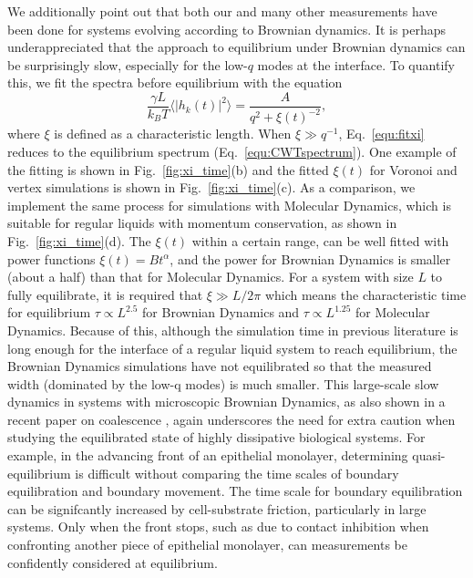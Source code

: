 \documentclass[twoside,twocolumn,9pt]{article}
\begin{document}
We additionally point out that both our and many other measurements have been done for systems evolving according to Brownian dynamics. It is perhaps underappreciated that the approach to equilibrium under Brownian dynamics can be surprisingly slow, especially for the low-$q$ modes at the interface. To quantify this, we fit the spectra before equilibrium with the equation 
\begin{equation}
    \frac{\gamma L}{k_B T}\langle |h_k(t)|^2\rangle = \frac{A}{q^2+\xi(t)^{-2}}, 
    \label{equ:fitxi}
\end{equation}
where $\xi$ is defined as a characteristic length. When $\xi \gg q^{-1}$, Eq.~\ref{equ:fitxi} reduces to the equilibrium spectrum (Eq.~\ref{equ:CWTspectrum}). One example of the fitting is shown in Fig.~\ref{fig:xi_time}(b) and the fitted $\xi(t)$ for Voronoi and vertex simulations is shown in Fig.~\ref{fig:xi_time}(c). As a comparison, we implement the same process for simulations with Molecular Dynamics, which is suitable for regular liquids with momentum conservation, as shown in Fig.~\ref{fig:xi_time}(d). The $\xi(t)$ within a certain range, can be well fitted with power functions $\xi(t)=Bt^\alpha$, and the power for Brownian Dynamics is smaller (about a half) than that for Molecular Dynamics. For a system with size $L$ to fully equilibrate, it is required that $\xi \gg L/2\pi$ which means the characteristic time for equilibrium $\tau \propto L^{2.5}$ for Brownian Dynamics and $\tau \propto L^{1.25}$ for Molecular Dynamics. Because of this, although the simulation time in previous literature \cite{sussman2018soft} is long enough for the interface of a regular liquid system to reach equilibrium, the Brownian Dynamics simulations have not equilibrated so that the measured width (dominated by the low-q modes) is much smaller. This large-scale slow dynamics in systems with microscopic Brownian Dynamics, as also shown in a recent paper on coalescence \cite{yue2024coalescing}, again underscores the need for extra caution when studying the equilibrated state of highly dissipative biological systems. For example, in the advancing front of an epithelial monolayer, determining quasi-equilibrium is difficult without comparing the time scales of boundary equilibration and boundary movement. The time scale for boundary equilibration can be signifcantly increased by cell-substrate friction, particularly in large systems. Only when the front stops, such as due to contact inhibition when confronting another piece of epithelial monolayer, can measurements be confidently considered at equilibrium.  
\end{document}
